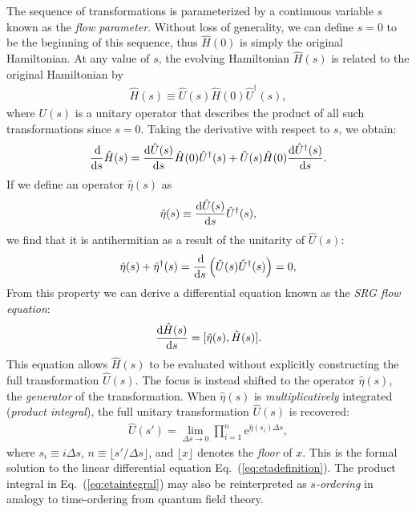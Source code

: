 The sequence of transformations is parameterized by a continuous variable $s$ known as the \textit{flow parameter}.  Without loss of generality, we can define $s = 0$ to be the beginning of this sequence, thus $\hat{H}(0)$ is simply the original Hamiltonian.  At any value of $s$, the evolving Hamiltonian $\hat{H}(s)$ is related to the original Hamiltonian by
\begin{align*}
  \hat{H}(s) \equiv \hat{U}(s) \hat{H}(0) \hat{U}^\dagger(s),
\end{align*}
where $U(s)$ is a unitary operator that describes the product of all such transformations since $s = 0$.  Taking the derivative with respect to $s$, we obtain:
\begin{align*}
  \frac{\operatorname{d\!}}{\operatorname{d\!} s} \hat{H}(s) = \frac{\operatorname{d\!} \hat{U}(s)}{\operatorname{d\!} s} \hat{H}(0) \hat{U}^\dagger(s) + \hat{U}(s) \hat{H}(0) \frac{\operatorname{d\!} \hat{U}^\dagger (s)}{\operatorname{d\!} s}.
\end{align*}
If we define an operator $\hat{\eta}(s)$ as
\begin{align} \label{eq:etadefinition}
  \hat{\eta}(s) \equiv \frac{\operatorname{d\!} \hat{U}(s)}{\operatorname{d\!} s} \hat{U}^\dagger(s),
\end{align}
we find that it is antihermitian as a result of the unitarity of $\hat{U}(s)$:
\begin{align*}
  \hat{\eta}(s) + \hat{\eta}^\dagger(s)
  = \frac{\operatorname{d\!}}{\operatorname{d\!} s} \left(\hat{U}(s) \hat{U}^\dagger(s)\right)
  = 0,
\end{align*}
From this property we can derive a differential equation known as the \textit{SRG flow equation}:
\begin{align} \label{eq:imsrgode}
  \frac{\operatorname{d\!} \hat{H}(s)}{\operatorname{d\!} s} = [\hat{\eta}(s), \hat{H}(s)].
\end{align}
This equation allows $\hat{H}(s)$ to be evaluated without explicitly constructing the full transformation $\hat U(s)$.  The focus is instead shifted to the operator $\hat \eta(s)$, the \textit{generator} of the transformation.  When $\hat \eta(s)$ is \emph{multiplicatively} integrated (\textit{product integral}), the full unitary transformation $\hat U(s)$ is recovered:
\begin{align} \label{eq:etaintegral}
  \hat U(s')
  = \lim_{\Delta s \to 0} \prod_{i = 1}^n \mathrm{e}^{\hat{\eta}(s_i) \Delta s},
\end{align}
where $s_i \equiv i \Delta s$, $n \equiv \lfloor s' / \Delta s \rfloor$, and $\lfloor x \rfloor$ denotes the \textit{floor} of $x$.  This is the formal solution to the linear differential equation Eq.\ (\ref{eq:etadefinition}).  The product integral in Eq.\ (\ref{eq:etaintegral}) may also be reinterpreted as \textit{$s$-ordering} \cite{reimann2013quantum} in analogy to time-ordering from quantum field theory.

